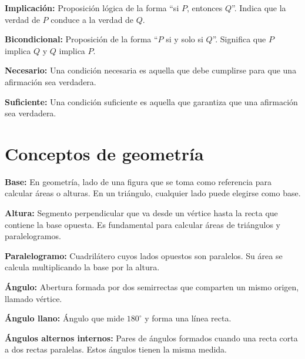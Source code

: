 \documentclass[12pt,final]{report}
\theoremstyle{plain}
\theoremstyle{definition}
\begin{document}
\textbf{Implicación:} Proposición lógica de la forma ``si $P$, entonces $Q$''. Indica que la verdad de $P$ conduce a la verdad de $Q$.

\vspace{0.5em}

\textbf{Bicondicional:} Proposición de la forma ``$P$ si y solo si $Q$''. Significa que $P$ implica $Q$ y $Q$ implica $P$.

\vspace{0.5em}

\textbf{Necesario:} Una condición necesaria es aquella que debe cumplirse para que una afirmación sea verdadera.

\vspace{0.5em}

\textbf{Suficiente:} Una condición suficiente es aquella que garantiza que una afirmación sea verdadera.

\section*{Conceptos de geometría}

\vspace{0.5em}

\textbf{Base:} En geometría, lado de una figura que se toma como referencia para calcular áreas o alturas. En un triángulo, cualquier lado puede elegirse como base.

\vspace{0.5em}

\textbf{Altura:} Segmento perpendicular que va desde un vértice hasta la recta que contiene la base opuesta. Es fundamental para calcular áreas de triángulos y paralelogramos.

\vspace{0.5em}

\textbf{Paralelogramo:} Cuadrilátero cuyos lados opuestos son paralelos. Su área se calcula multiplicando la base por la altura.

\vspace{0.5em}

\textbf{Ángulo:} Abertura formada por dos semirrectas que comparten un mismo origen, llamado vértice.

\vspace{0.5em}

\textbf{Ángulo llano:} Ángulo que mide $180^\circ$ y forma una línea recta.

\vspace{0.5em}

\textbf{Ángulos alternos internos:} Pares de ángulos formados cuando una recta corta a dos rectas paralelas. Estos ángulos tienen la misma medida.
\end{document}
